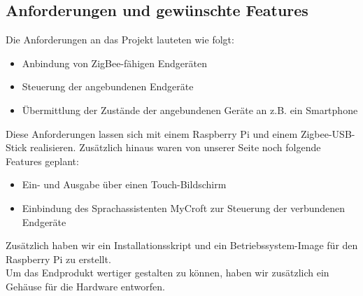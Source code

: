 \subsection{Anforderungen und gewünschte Features}\label{zs_anforderungen}
Die Anforderungen an das Projekt lauteten wie folgt:
\begin{itemize}
	\item Anbindung von ZigBee-fähigen Endgeräten
	\item Steuerung der angebundenen Endgeräte
	\item Übermittlung der Zustände der angebundenen Geräte an z.B. ein Smartphone
\end{itemize}
Diese Anforderungen lassen sich mit einem Raspberry Pi und einem Zigbee-USB-Stick realisieren. 
Zusätzlich hinaus waren von unserer Seite noch folgende Features geplant:
\begin{itemize}
	\item Ein- und Ausgabe über einen Touch-Bildschirm
	\item Einbindung des Sprachassistenten MyCroft zur Steuerung der verbundenen Endgeräte
\end{itemize}
Zusätzlich haben wir ein Installationsskript und ein Betriebssystem-Image für den Raspberry Pi zu erstellt.\\
\noindent Um das Endprodukt wertiger gestalten zu können,  haben wir zusätzlich ein Gehäuse für die Hardware entworfen.